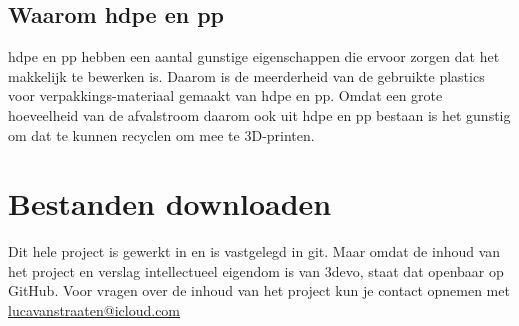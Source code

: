 \subsection{Waarom \ac{hdpe} en \ac{pp}}

\ac{hdpe} en \ac{pp} hebben een aantal gunstige eigenschappen die ervoor
zorgen dat het makkelijk te bewerken is.  Daarom is de meerderheid van de
gebruikte plastics voor verpakkings-materiaal gemaakt van \ac{hdpe} en \ac{pp}.
Omdat een grote hoeveelheid van de afvalstroom daarom ook uit \ac{hdpe} en
\ac{pp} bestaan is het gunstig om dat te kunnen recyclen om mee te 3D-printen.

\section{Bestanden downloaden}

Dit hele project is gewerkt in en is vastgelegd in git. Maar omdat de inhoud
van het project en verslag intellectueel eigendom is van 3devo, staat dat
openbaar op GitHub. Voor vragen over de inhoud van het project kun je contact
opnemen met
\href{mailto:lucavanstraaten@icloud.com}{lucavanstraaten@icloud.com}
